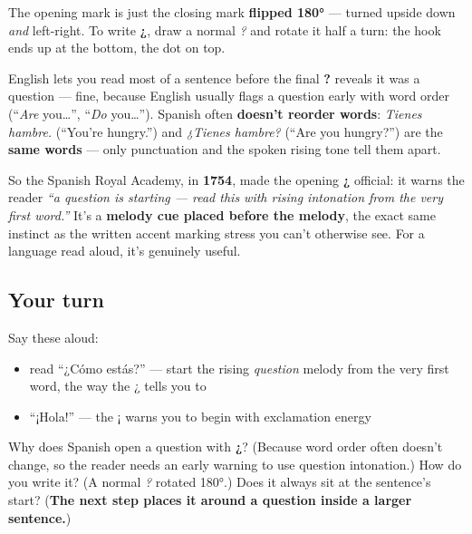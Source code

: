 The opening mark is just the closing mark \textbf{flipped 180°} — turned upside down \emph{and} left-right. To write \textbf{¿}, draw a normal \emph{?} and rotate it half a turn: the hook ends up at the bottom, the dot on top.

\begin{culture}
English lets you read most of a sentence before the final \textbf{?} reveals it was a question — fine, because English usually flags a question early with word order (\textquotedblleft{}\emph{Are} you…\textquotedblright{}, \textquotedblleft{}\emph{Do} you…\textquotedblright{}). Spanish often \textbf{doesn't reorder words}: \emph{Tienes hambre.} (\textquotedblleft{}You're hungry.\textquotedblright{}) and \emph{¿Tienes hambre?} (\textquotedblleft{}Are you hungry?\textquotedblright{}) are the \textbf{same words} — only punctuation and the spoken rising tone tell them apart.

So the Spanish Royal Academy, in \textbf{1754}, made the opening \textbf{¿} official: it warns the reader \emph{\textquotedblleft{}a question is starting — read this with rising intonation from the very first word.\textquotedblright{}} It's a \textbf{melody cue placed before the melody}, the exact same instinct as the written accent marking stress you can't otherwise see. For a language read aloud, it's genuinely useful.
\end{culture}

\subsection*{Your turn}
Say these aloud:

\begin{itemize}
\raggedright
  \item read \textquotedblleft{}¿Cómo estás?\textquotedblright{} — start the rising \emph{question} melody from the very first word, the way the ¿ tells you to
  \item \textquotedblleft{}¡Hola!\textquotedblright{} — the ¡ warns you to begin with exclamation energy
\end{itemize}

\begin{tcolorbox}[breakable,colback=teal!4,colframe=teal!35!black,title={Before you move on}]
Why does Spanish open a question with \textbf{¿}? (Because word order often doesn't change, so the reader needs an early warning to use question intonation.) How do you write it? (A normal \emph{?} rotated 180°.) Does it always sit at the sentence's start? (\textbf{The next step places it around a question inside a larger sentence.})
\end{tcolorbox}
